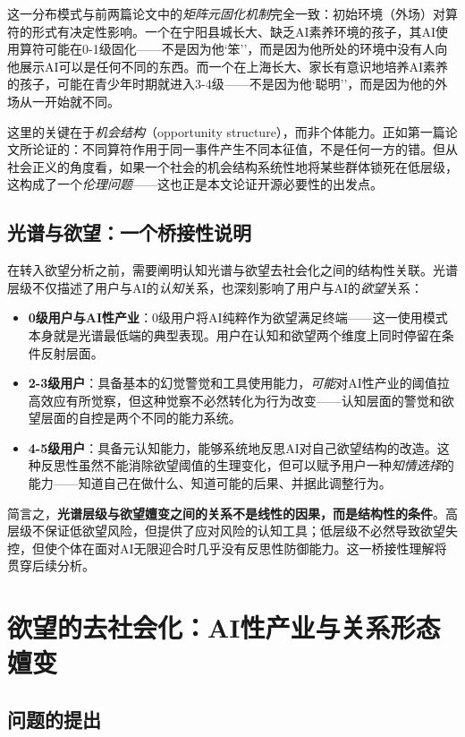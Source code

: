 \documentclass[12pt,a4paper]{ctexart}
\begin{document}
这一分布模式与前两篇论文中的\emph{矩阵元固化机制}完全一致：初始环境（外场）对算符的形式有决定性影响。一个在宁阳县城长大、缺乏AI素养环境的孩子，其AI使用算符可能在0-1级固化——不是因为他`笨''，而是因为他所处的环境中没有人向他展示AI可以是任何不同的东西。而一个在上海长大、家长有意识地培养AI素养的孩子，可能在青少年时期就进入3-4级——不是因为他`聪明''，而是因为他的外场从一开始就不同。

这里的关键在于\textit{机会结构}（opportunity structure），而非个体能力。正如第一篇论文所论证的：不同算符作用于同一事件产生不同本征值，不是任何一方的错。但从社会正义的角度看，如果一个社会的机会结构系统性地将某些群体锁死在低层级，这构成了一个\textit{伦理问题}——这也正是本文论证开源必要性的出发点。


\subsection{光谱与欲望：一个桥接性说明}

在转入欲望分析之前，需要阐明认知光谱与欲望去社会化之间的结构性关联。光谱层级不仅描述了用户与AI的\emph{认知}关系，也深刻影响了用户与AI的\emph{欲望}关系：

\begin{itemize}
\item \textbf{0级用户与AI性产业}：0级用户将AI纯粹作为欲望满足终端——这一使用模式本身就是光谱最低端的典型表现。用户在认知和欲望两个维度上同时停留在条件反射层面。
\item \textbf{2-3级用户}：具备基本的幻觉警觉和工具使用能力，\emph{可能}对AI性产业的阈值拉高效应有所觉察，但这种觉察不必然转化为行为改变——认知层面的警觉和欲望层面的自控是两个不同的能力系统。
\item \textbf{4-5级用户}：具备元认知能力，能够系统地反思AI对自己欲望结构的改造。这种反思性虽然不能消除欲望阈值的生理变化，但可以赋予用户一种\emph{知情选择}的能力——知道自己在做什么、知道可能的后果、并据此调整行为。
\end{itemize}

简言之，\textbf{光谱层级与欲望嬗变之间的关系不是线性的因果，而是结构性的条件}。高层级不保证低欲望风险，但提供了应对风险的认知工具；低层级不必然导致欲望失控，但使个体在面对AI无限迎合时几乎没有反思性防御能力。这一桥接性理解将贯穿后续分析。


\section{欲望的去社会化：AI性产业与关系形态嬗变}

\subsection{问题的提出}
\end{document}
